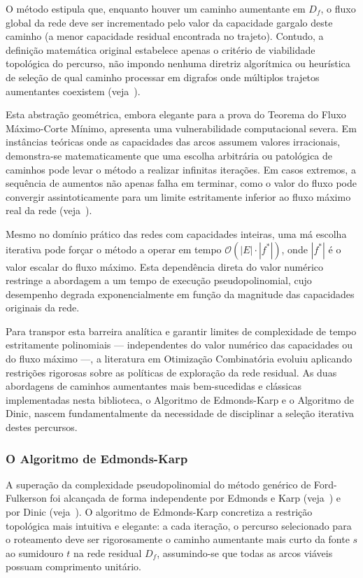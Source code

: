 \documentclass[12pt,a4paper]{article}
\begin{document}
O método estipula que, enquanto houver um caminho aumentante em $D_f$, o fluxo global da rede deve ser incrementado pelo valor da capacidade gargalo deste caminho (a menor capacidade residual encontrada no trajeto). Contudo, a definição matemática original estabelece apenas o critério de viabilidade topológica do percurso, não impondo nenhuma diretriz algorítmica ou heurística de seleção de qual caminho processar em digrafos onde múltiplos trajetos aumentantes coexistem (veja~\cite{ahuja1993network}).

Esta abstração geométrica, embora elegante para a prova do Teorema do Fluxo Máximo-Corte Mínimo, apresenta uma vulnerabilidade computacional severa. Em instâncias teóricas onde as capacidades das arcos assumem valores irracionais, demonstra-se matematicamente que uma escolha arbitrária ou patológica de caminhos pode levar o método a realizar infinitas iterações. Em casos extremos, a sequência de aumentos não apenas falha em terminar, como o valor do fluxo pode convergir assintoticamente para um limite estritamente inferior ao fluxo máximo real da rede (veja~\cite{cook1998combinatorial}).

Mesmo no domínio prático das redes com capacidades inteiras, uma má escolha iterativa pode forçar o método a operar em tempo $\mathcal{O}(|E| \cdot |f^*|)$, onde $|f^*|$ é o valor escalar do fluxo máximo. Esta dependência direta do valor numérico restringe a abordagem a um tempo de execução pseudopolinomial, cujo desempenho degrada exponencialmente em função da magnitude das capacidades originais da rede.

Para transpor esta barreira analítica e garantir limites de complexidade de tempo estritamente polinomiais — independentes do valor numérico das capacidades ou do fluxo máximo —, a literatura em Otimização Combinatória evoluiu aplicando restrições rigorosas sobre as políticas de exploração da rede residual. As duas abordagens de caminhos aumentantes mais bem-sucedidas e clássicas implementadas nesta biblioteca, o Algoritmo de Edmonds-Karp e o Algoritmo de Dinic, nascem fundamentalmente da necessidade de disciplinar a seleção iterativa destes percursos.

\subsubsection{O Algoritmo de Edmonds-Karp}

A superação da complexidade pseudopolinomial do método genérico de Ford-Fulkerson foi alcançada de forma independente por Edmonds e Karp (veja~\cite{edmonds1972theoretical}) e por Dinic (veja~\cite{dinic1970algorithm}). O algoritmo de Edmonds-Karp concretiza a restrição topológica mais intuitiva e elegante: a cada iteração, o percurso selecionado para o roteamento deve ser rigorosamente o caminho aumentante mais curto da fonte $s$ ao sumidouro $t$ na rede residual $D_f$, assumindo-se que todas as arcos viáveis possuam comprimento unitário.
\end{document}
